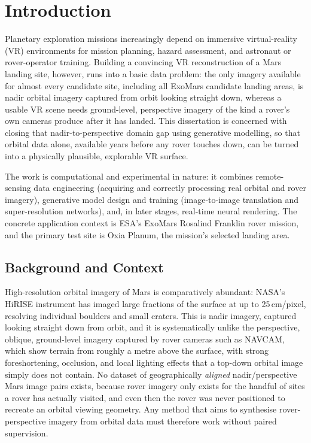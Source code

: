 \chapter{Introduction}

Planetary exploration missions increasingly depend on immersive virtual-reality (VR) environments for mission planning, hazard assessment, and astronaut or rover-operator training. Building a convincing VR reconstruction of a Mars landing site, however, runs into a basic data problem: the only imagery available for almost every candidate site, including all ExoMars candidate landing areas, is nadir orbital imagery captured from orbit looking straight down, whereas a usable VR scene needs ground-level, perspective imagery of the kind a rover's own cameras produce after it has landed. This dissertation is concerned with closing that nadir-to-perspective domain gap using generative modelling, so that orbital data alone, available years before any rover touches down, can be turned into a physically plausible, explorable VR surface.

The work is computational and experimental in nature: it combines remote-sensing data engineering (acquiring and correctly processing real orbital and rover imagery), generative model design and training (image-to-image translation and super-resolution networks), and, in later stages, real-time neural rendering. The concrete application context is ESA's ExoMars Rosalind Franklin rover mission, and the primary test site is Oxia Planum, the mission's selected landing area.

\section{Background and Context}

High-resolution orbital imagery of Mars is comparatively abundant: NASA's HiRISE instrument has imaged large fractions of the surface at up to 25\,cm/pixel, resolving individual boulders and small craters. This is nadir imagery, captured looking straight down from orbit, and it is systematically unlike the perspective, oblique, ground-level imagery captured by rover cameras such as NAVCAM, which show terrain from roughly a metre above the surface, with strong foreshortening, occlusion, and local lighting effects that a top-down orbital image simply does not contain. No dataset of geographically \emph{aligned} nadir/perspective Mars image pairs exists, because rover imagery only exists for the handful of sites a rover has actually visited, and even then the rover was never positioned to recreate an orbital viewing geometry. Any method that aims to synthesise rover-perspective imagery from orbital data must therefore work without paired supervision.

